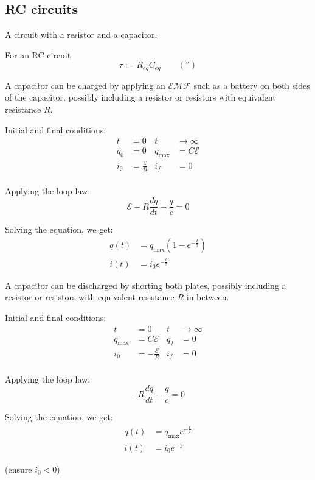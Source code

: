 \subsection{RC circuits}

\begin{definition}[RC circuit]
  A circuit with a resistor and a capacitor.
\end{definition}

\begin{definition}
  For an RC circuit,
  \[
    \tau := R_{eq} C_{eq} \qquad (\second)
  \]
\end{definition}

\begin{law}
  A capacitor can be charged by applying an $\mathcal{EMF}$ such as a battery on both sides of the capacitor, possibly including a resistor or resistors with equivalent resistance $R$.

  Initial and final conditions:
  \begin{align*}
    t &= 0 & t &\to \infty \\
    q_0 &= 0 & q_{\text{max}} &= C\mathcal{E} \\
    i_0 &= \frac{\mathcal{E}}{R} & i_f &= 0 \\
  \end{align*}

  Applying the loop law:
  \[
    \mathcal{E} - R \frac{dq}{dt} - \frac{q}{c} = 0
  \]

  Solving the equation, we get:
  \begin{align*}
    q(t) &= q_{\text{max}} \left(1 - e^{- \frac{t}{\tau}}\right) \\
    i(t) &= i_0 e^{- \frac{t}{\tau}}
  \end{align*}
\end{law}

\begin{law}
  A capacitor can be discharged by shorting both plates, possibly including a resistor or resistors with equivalent resistance $R$ in between.

  Initial and final conditions:
  \begin{align*}
    t &= 0 & t &\to \infty \\
    q_{\text{max}} &= C\mathcal{E} & q_f &= 0 \\
    i_0 &= -\frac{\mathcal{E}}{R} & i_f &= 0 \\
  \end{align*}

  Applying the loop law:
  \[
    - R \frac{dq}{dt} - \frac{q}{c} = 0
  \]

  Solving the equation, we get:
  \begin{align*}
    q(t) &= q_{\text{max}} e^{- \frac{t}{\tau}} \\
    i(t) &= i_0 e^{- \frac{t}{\tau}}
  \end{align*}

  (ensure $i_0 < 0$)
\end{law}

